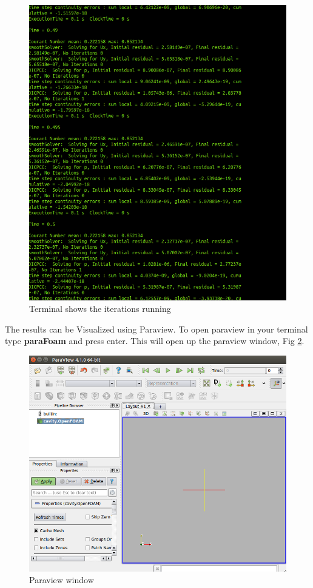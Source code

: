 \documentclass[a4paper,12pt]{report}
\begin{document}
\begin{figure}[ht]  
\begin{center}  
\includegraphics[scale=0.3]{solver.png}
\caption{Terminal shows the iterations running}
\label{solver}
\end{center}  
\end{figure}

\flushleft The results can be Visualized using Paraview. To open paraview in your terminal type \textbf{paraFoam} and press enter. This will open up the paraview window, Fig \ref{pv}.

\begin{figure}[ht]  
\begin{center}  
\includegraphics[scale=0.32]{paraview.png}
\caption{Paraview window}
\label{pv}
\end{center}  
\end{figure}
\end{document}
